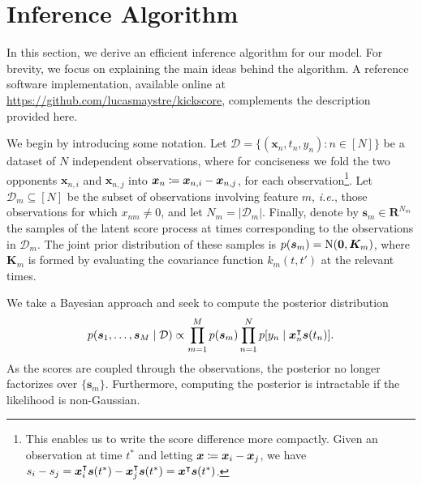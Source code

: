 \section{Inference Algorithm}
\label{kks:sec:inference}

In this section, we derive an efficient inference algorithm for our model.
For brevity, we focus on explaining the main ideas behind the algorithm.
A reference software implementation, available online at \url{https://github.com/lucasmaystre/kickscore}, complements the description provided here.

We begin by introducing some notation.
Let $\mathcal{D} = \{ (\bm{x}_n, t_n, y_n) : n \in [N] \}$ be a dataset of $N$ independent observations, where for conciseness we fold the two opponents $\bm{x}_{n,i}$ and $\bm{x}_{n,j}$ into $\bm{x}_n \coloneqq \bm{x}_{n,i} - \bm{x}_{n,j}$, for each observation\footnote{%
	This enables us to write the score difference more compactly.
	Given an observation at time $t^*$ and letting $\bm{x} \coloneqq \bm{x}_i - \bm{x}_j$, we have $s_i - s_j = \bm{x}_i^\intercal \bm{s}(t^*) - \bm{x}_j^\intercal \bm{s}(t^*) = \bm{x}^\intercal \bm{s}(t^*)$.
}.
Let $\mathcal{D}_m \subseteq [N]$ be the subset of observations involving feature $m$, \textit{i.e.}, those observations for which $x_{nm} \ne 0$, and let $N_m = \lvert \mathcal{D}_m \rvert$.
Finally, denote by $\bm{s}_m \in \mathbf{R}^{N_m}$ the samples of the latent score process at times corresponding to the observations in $\mathcal{D}_m$.
The joint prior distribution of these samples is $p(\bm{s}_m) = \mathrm{N}( \bm{0}, \bm{K}_m )$, where $\bm{K}_m$ is formed by evaluating the covariance function $k_m(t, t')$ at the relevant times.

We take a Bayesian approach and seek to compute the posterior distribution
\begin{align}
	\label{kks:eq:truepost}
	p(\bm{s}_1, \ldots, \bm{s}_M \mid \mathcal{D}) \propto \prod_{m = 1}^M p(\bm{s}_m) \prod_{n = 1}^N p[y_n \mid \bm{x}_n^\intercal \bm{s}(t_n)].
\end{align}
As the scores are coupled through the observations, the posterior no longer factorizes over $\{ \bm{s}_m \}$.
Furthermore, computing the posterior is intractable if the likelihood is non-Gaussian.


